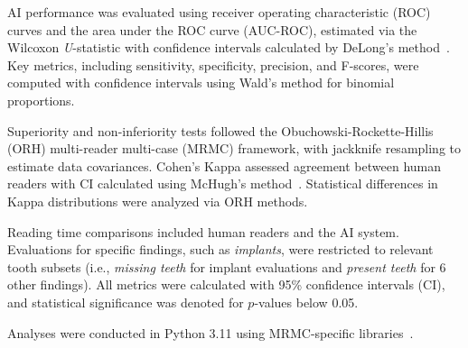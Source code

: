 AI performance was evaluated using receiver operating characteristic (ROC) curves and the area under the ROC curve (AUC-ROC), estimated via the Wilcoxon \emph{U}-statistic with confidence intervals calculated by DeLong's method~\citep{delong1988comparing}. 
Key metrics, including sensitivity, specificity, precision, and F-scores, were computed with confidence intervals using Wald's method for binomial proportions.


Superiority and non-inferiority tests followed the Obuchowski-Rockette-Hillis (ORH) multi-reader multi-case (MRMC) framework, with jackknife resampling to estimate data covariances. 
Cohen's Kappa assessed agreement between human readers with CI calculated using McHugh's method~\citep{mchugh2012interrater}.
Statistical differences in Kappa distributions were analyzed via ORH methods.


Reading time comparisons included human readers and the AI system.
Evaluations for specific findings, such as \emph{implants}, were restricted to relevant tooth subsets (i.e., \emph{missing teeth} for implant evaluations and \emph{present teeth} for 6 other findings).
All metrics were calculated with 95\% confidence intervals (CI), and statistical significance was denoted for $p$-values below 0.05.


Analyses were conducted in Python 3.11 using MRMC-specific libraries~\citep{mckinney2022comparing}.